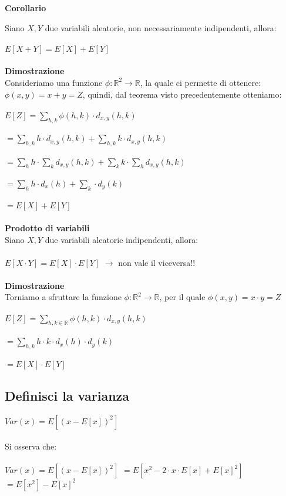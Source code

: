 \documentclass[a4paper,12pt]{report}
\begin{document}
	\begin{flushleft}
		\textbf{Corollario}
	\end{flushleft}
	Siano $X, Y$ due variabili aleatorie, non necessariamente indipendenti, allora: \\\\
	$E[X + Y] = E[X] + E[Y]$ \\ \\
	\textbf{Dimostrazione} \\
	Consideriamo una funzione $\phi : \mathbb{R}^2 \rightarrow \mathbb{R}$, la quale ci permette di ottenere: $\phi(x, y) = x + y = Z$, quindi, dal teorema visto precedentemente otteniamo:\\\\
	$E[Z] = \sum_{h, k} \phi(h, k) \cdot d_{x,y}(h, k)$ \\\\
	$ = \sum_{h, k} h \cdot d_{x, y}(h, k) + \sum_{h, k} k \cdot d_{x, y}(h, k)$ \\\\
	$ = \sum_{h}h \cdot \sum_{k}d_{x, y}(h, k) + \sum_{k}k \cdot \sum_{h}d_{x, y}(h, k)$ \\\\
	$ = \sum_{h}h \cdot d_x(h) + \sum_{k} \cdot d_y(k)$ \\\\
	$ = E[X] + E[Y]$	
	\\\\
	\textbf{Prodotto di variabili} \\
	Siano $X, Y$ due variabili aleatorie indipendenti, allora: \\\\
	$E[X \cdot Y] = E[X] \cdot E[Y]$ $\rightarrow$ non vale il viceversa!! \\\\
	\textbf{Dimostrazione} \\ 
	Torniamo a sfruttare la funzione $\phi : \mathbb{R}^2 \rightarrow \mathbb{R}$, per il quale $\phi(x, y) = x\cdot y = Z$ \\\\
	$E[Z] = \sum_{h, k \in \mathbb{R}} \phi(h, k) \cdot d_{x, y}(h, k)$ \\\\
	$= \sum_{h, k} h \cdot k \cdot d_x(h) \cdot d_y(k)$ \\\\
	$ = E[X] \cdot E[Y]$
	
	\subsection{Definisci la varianza}
	$Var(x) = E[(x - E[x])^2]$ \\\\
	Si osserva che: \\\\
	$Var(x) = E[(x - E[x])^2]$
	$ = E[x^2 - 2\cdot x \cdot E[x] + E[x]^2]$
	$ = E[x^2] - E[x]^2$
	
\end{document}
